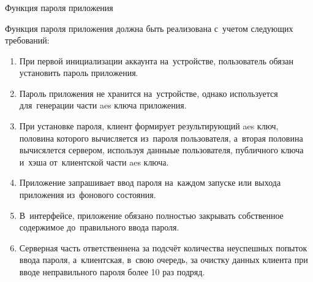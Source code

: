 \subsubsection{} Функция пароля приложения
\label{sec:analysis:research:funcreq:pin}

Функция пароля приложения должна быть реализована с~учетом следующих требований:
\begin{enumerate}
	\item При первой инициализации аккаунта на~устройстве, пользователь обязан установить пароль приложения.
	\item Пароль приложения не хранится на~устройстве, однако используется для~генерации части \gls{aes} ключа приложения.
	\item При установке пароля, клиент формирует результирующий \gls{aes} ключ, половина которого вычисляется из~пароля пользователя, а~вторая половина вычисялется сервером, используя данныые пользователя, публичного ключа и~хэша от~клиентской части \gls{aes} ключа.
	\item Приложение запрашивает ввод пароля на~каждом запуске или выхода приложения из~фонового состояния.
	\item В~интерфейсе, приложение обязано полностью закрывать собственное содержимое до~правильного ввода пароля.
	\item Серверная часть ответственнена за подсчёт количества неуспешных попыток ввода пароля, а~клиентская, в~свою очередь, за очистку данных клиента при вводе неправильного пароля более 10 раз подряд.
\end{enumerate}